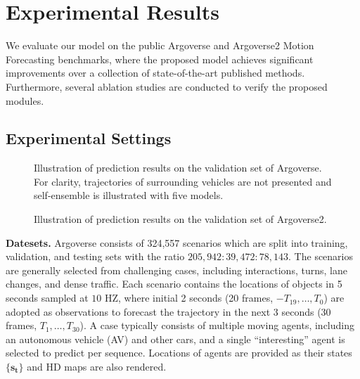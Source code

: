 \documentclass[letterpaper, 10 pt, conference]{ieeeconf}
\begin{document}
\section{Experimental Results}
We evaluate our model on the public Argoverse and Argoverse2 Motion Forecasting benchmarks, where the proposed model achieves significant improvements over a collection of state-of-the-art published methods. Furthermore, several ablation studies are conducted to verify the proposed modules.

\label{sec:result}
\subsection{Experimental Settings}


\begin{figure*}[tp]
\renewcommand{\baselinestretch}{1.0}
\renewcommand{\abovecaptionskip}{0pt}
\vskip 0.2in
 \caption{Illustration of prediction results on the validation set of Argoverse. 
 For clarity, trajectories of surrounding vehicles are not presented and  self-ensemble is illustrated with five models. } \label{fig.2}
\vskip -0.05in
\end{figure*}

\begin{figure*}
\centering
{}
\hspace{0.25in}
 \caption{Illustration of prediction results on the validation set of Argoverse2. } \label{fig.3}
\vskip -0.15in
\end{figure*} 

\textbf{Datesets.}  Argoverse \cite{chang2019argoverse} consists of 324,557 scenarios which are split into training, validation, and testing sets with the ratio $205,942:39,472:78,143$. The scenarios are generally selected from challenging cases, including interactions, turns, lane changes, and  dense traffic. Each scenario contains the locations of objects in 5 seconds  sampled at $10$ HZ, where initial 2 seconds (20 frames, $-T_{19}, \dots, T_0$) are adopted as observations to forecast the trajectory in the next 3 seconds (30 frames, $T_1, \dots, T_{30}$). A case typically consists of multiple moving agents, including an autonomous vehicle (AV) and other cars, and a single ``interesting'' agent is selected to predict per sequence. Locations of agents are provided as their states $\{\bm{s_t}\}$ and HD maps are also rendered.
 
\end{document}
